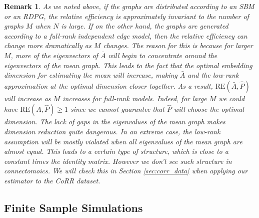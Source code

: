 \documentclass[10pt,letterpaper]{article}
\newtheorem{remark}[fact]{Remark}
\renewcommand{\hat}{\widehat}
\begin{document}
\begin{remark}\label{remark:low_rank}
As we noted above, if the graphs are distributed according to an SBM or an RDPG, the relative efficiency is approximately invariant to the number of graphs $M$ when $N$ is large.
If on the other hand, the graphs are generated according to a full-rank independent edge model, then the relative efficiency can change more dramatically as $M$ changes. 
The reason for this is because for larger $M$, more of the eigenvectors of $\bar{A}$ will begin to concentrate around the eigenvectors of the mean graph.
This leads to the fact that the optimal embedding dimension for estimating the mean will increase, making $\bar{A}$ and the low-rank approximation at the optimal dimension closer together. 
As a result, $\mathrm{RE}(\bar{A},\hat{P})$ will increase as $M$ increases for full-rank models.
Indeed, for large $M$ we could have $\mathrm{RE}(\bar{A},\hat{P})\geq 1$ since we cannot guarantee that $\hat{P}$ will choose the optimal dimension.
The lack of gaps in the eigenvalues of the mean graph makes dimension reduction quite dangerous.
In an extreme case, the low-rank assumption will be mostly violated when all eigenvalues of the mean graph are almost equal. This leads to a certain type of structure, which is close to a constant times the identity matrix. However we don't see such structure in connectomoics.
We will check this in Section \ref{sec:corr_data} when applying our estimator to the CoRR dataset.
\end{remark}

\subsection{Finite Sample Simulations}\label{sec:sbm_sim}
\end{document}
